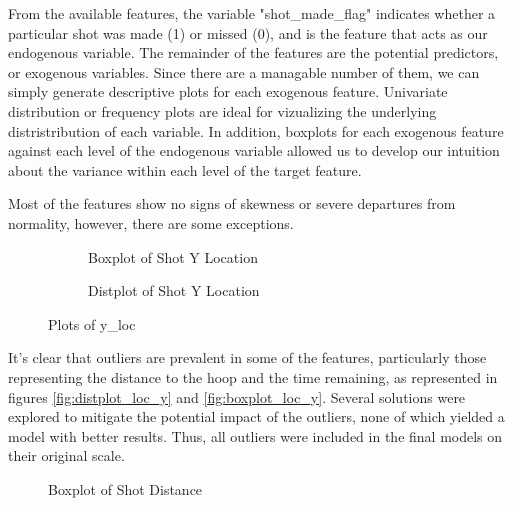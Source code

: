    \vskip 1cm
\par \indent From the available features, the variable "shot\_made\_flag" indicates whether a particular
shot was made (1) or missed (0), and is the feature that acts as our endogenous variable. The remainder of the features are the potential predictors, or exogenous variables. Since there are a managable number of them, we can simply generate descriptive plots for each exogenous feature.  Univariate distribution or frequency plots are ideal for vizualizing the underlying distristribution of each variable. In addition, boxplots for each exogenous feature against each level of the endogenous variable allowed us to develop our intuition about the variance within each level of the target feature.\par

Most of the features show no signs of skewness or severe departures from normality, however, there are some exceptions.



\vskip 1cm
\begin{figure}
    \centering
    \begin{subfigure}[b]{0.4\textwidth}
        \caption{\label{fig:boxplot_loc_y} Boxplot of Shot Y Location}
      \label{fig:1}
    \end{subfigure}
    \begin{subfigure}[b]{0.4\textwidth}
        \caption{\label{fig:distplot_loc_y} Distplot of Shot Y Location}
      \label{fig:2}
    \end{subfigure}
    \caption{\label{fig:y_loc_plots} Plots of y\_loc}
\end{figure}
\vskip 1cm

\indent It's clear that outliers are prevalent in some of the features, particularly those representing the distance to the hoop and the time remaining, as represented in figures \ref{fig:distplot_loc_y} and \ref{fig:boxplot_loc_y}.  Several solutions were explored to mitigate the potential impact of the outliers, none of which yielded a model with better results. Thus, all outliers were included in the final models on their original scale.\par

\vskip 1cm
    \begin{figure}
    \caption{\label{fig:boxplot_shot_distance} Boxplot of Shot Distance}
\end{figure}
\vskip 1cm


